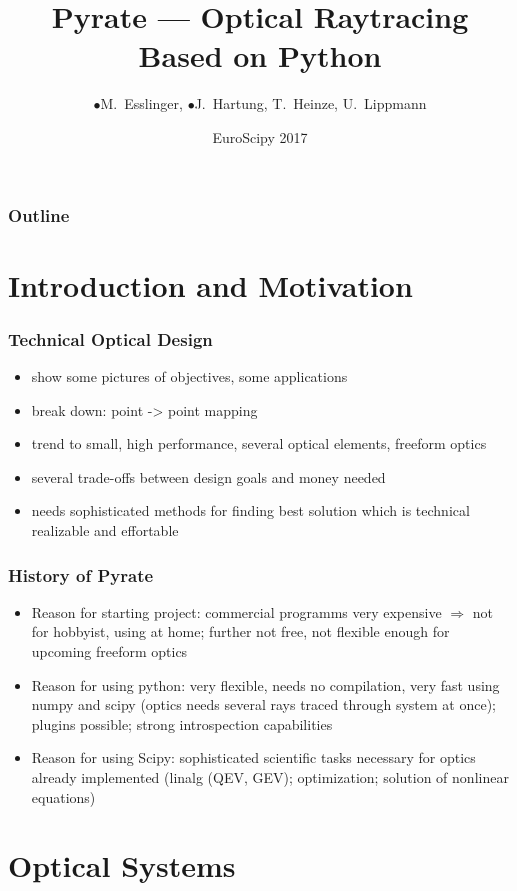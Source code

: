\documentclass[
10pt,
]{beamer}
\title[Pyrate -- Raytracing in Python]{Pyrate --- Optical Raytracing Based on Python}
\author[M. Esslinger, J. Hartung, T. Heinze, U. Lippmann]{\texorpdfstring{$\bullet$}{}M.~Esslinger, \texorpdfstring{$\bullet$}{}J.~Hartung, T.~Heinze, U.~Lippmann}
\date[EuroScipy 2017]{EuroScipy 2017}
\begin{document}
\begin{frame}
\titlepage
\end{frame}

\begin{frame}
 \frametitle{Outline}
 \tableofcontents
\end{frame}

\section{Introduction and Motivation}

\begin{frame}
 \frametitle{Technical Optical Design}
  \begin{itemize}
   \item show some pictures of objectives, some applications
   \item break down: point -> point mapping
   \item trend to small, high performance, several optical elements, freeform optics
   \item several trade-offs between design goals and money needed
   \item needs sophisticated methods for finding best solution which is technical realizable and effortable
  \end{itemize}

\end{frame}

\begin{frame}
 \frametitle{History of Pyrate}
 \begin{itemize}
  \item Reason for starting project: commercial programms very expensive 
      $\Rightarrow$ not for hobbyist, using at home; 
      further not free, not flexible enough for upcoming freeform optics
  \item Reason for using python: very flexible, needs no compilation, 
      very fast using numpy and scipy (optics needs several rays traced through system at once);
      plugins possible; strong introspection capabilities
  \item Reason for using Scipy: sophisticated scientific tasks necessary for optics already 
      implemented (linalg (QEV, GEV); optimization; solution of nonlinear equations)
 \end{itemize}

\end{frame}

\section{Optical Systems}
\end{document}
